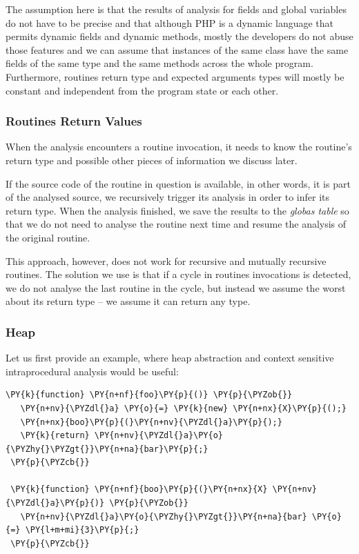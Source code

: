         The assumption here is that the results of analysis for fields 
        and global variables do not have to be precise and that although 
        PHP is a dynamic language that permits dynamic fields and dynamic 
        methods, mostly the developers do not abuse those features and 
        we can assume that instances of the same class have the same 
        fields of the same type and the same methods across the whole 
        program. Furthermore, routines return type and expected 
        arguments types will mostly be constant and independent 
        from the program state or each other.
        
        \subsubsection*{Routines Return Values}
        When the analysis encounters a routine invocation, it needs 
        to know the routine's return type and possible other pieces 
        of information we discuss later.
        
        If the source code of the routine in question is available, 
        in other words, it is part of the analysed source, we 
        recursively trigger its analysis in order to infer its 
        return type. When the analysis finished, we save the 
        results to the \emph{globas table} so that we do not 
        need to analyse the routine next time and resume the 
        analysis of the original routine.
        
        This approach, however, does not work for recursive 
        and mutually recursive routines. The solution we use 
        is that if a cycle in routines invocations is detected, 
        we do not analyse the last routine in the cycle, but 
        instead we assume the worst about its return type -- 
        we assume it can return any type.
        
        
        \subsubsection*{Heap}        
        Let us first provide an example, where heap abstraction and 
        context sensitive intraprocedural analysis would be useful:
        
%
\begin{Verbatim}[commandchars=\\\{\}]
 \PY{k}{function} \PY{n+nf}{foo}\PY{p}{()} \PY{p}{\PYZob{}}
   \PY{n+nv}{\PYZdl{}a} \PY{o}{=} \PY{k}{new} \PY{n+nx}{X}\PY{p}{();}
   \PY{n+nx}{boo}\PY{p}{(}\PY{n+nv}{\PYZdl{}a}\PY{p}{);}
   \PY{k}{return} \PY{n+nv}{\PYZdl{}a}\PY{o}{\PYZhy{}\PYZgt{}}\PY{n+na}{bar}\PY{p}{;}
 \PY{p}{\PYZcb{}}

 \PY{k}{function} \PY{n+nf}{boo}\PY{p}{(}\PY{n+nx}{X} \PY{n+nv}{\PYZdl{}a}\PY{p}{)} \PY{p}{\PYZob{}}
   \PY{n+nv}{\PYZdl{}a}\PY{o}{\PYZhy{}\PYZgt{}}\PY{n+na}{bar} \PY{o}{=} \PY{l+m+mi}{3}\PY{p}{;}
 \PY{p}{\PYZcb{}}
\end{Verbatim}
        
